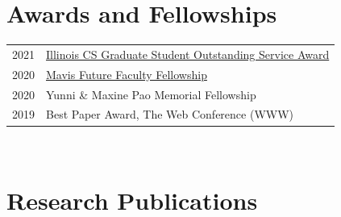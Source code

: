 \documentclass[10pt,singlecolumn]{article} %
\begin{document}
\section{Awards and Fellowships} 

\begin{tabular}{rl}

2021 & \href{https://cs.illinois.edu/about/awards/graduate-fellowships-awards/graduate-student-outstanding-service-award}{Illinois CS Graduate Student Outstanding Service Award} \\ 

2020 & \href{https://mavis.grainger.illinois.edu/}{Mavis Future Faculty Fellowship} \\

2020 & Yunni \& Maxine Pao Memorial Fellowship \\

2019 & Best Paper Award, The Web Conference (WWW) \\
\end{tabular}\\



\section{Research Publications} 
\end{document}
